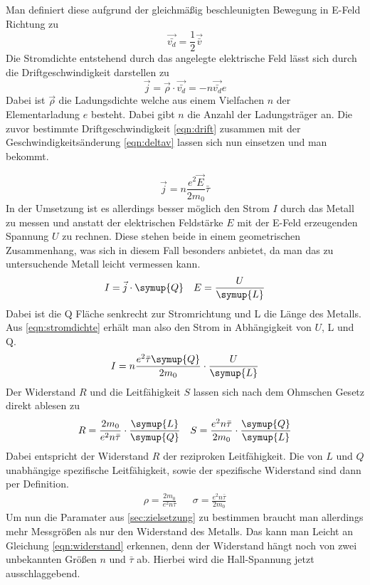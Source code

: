 Man definiert diese aufgrund der gleichmäßig beschleunigten Bewegung in E-Feld Richtung zu
\begin{equation}
\label{eqn:drift}
\vec{\bar{v_{d}}} = \frac{1}{2} \vec{\bar{v}}
\end{equation}
Die Stromdichte entstehend durch das angelegte elektrische Feld lässt sich durch die Driftgeschwindigkeit darstellen zu
\begin{equation}
\label{eqn:stromdichteunddrift}
\vec{j} = \vec{\rho} \cdot \vec{\bar{v_{d}}} = - n \vec{\bar{v_{d}}} e
\end{equation}
Dabei ist $\vec{\rho}$ die Ladungsdichte welche aus einem Vielfachen $n$ der Elementarladung $e$ besteht. Dabei gibt $n$ die Anzahl der Ladungsträger an.
Die zuvor bestimmte Driftgeschwindigkeit \eqref{eqn:drift} zusammen mit der Geschwindigkeitsänderung \eqref{eqn:deltav} lassen sich nun einsetzen und man bekommt.

\begin{equation}
\label{eqn:stromdichte}
\vec{j} = n \frac{e^{2}\vec{E}}{2m_{0}} \bar{\tau}
\end{equation}
In der Umsetzung ist es allerdings besser möglich den Strom $I$ durch das Metall zu messen und anstatt der elektrischen Feldstärke $E$ mit der E-Feld erzeugenden Spannung $U$
zu rechnen. Diese stehen beide in einem geometrischen Zusammenhang, was sich in diesem Fall besonders anbietet, da man das zu untersuchende Metall leicht vermessen kann.
\begin{align}
\label{eqn:querschnitt}
I = \vec{j} \cdot \symup{Q} && E = \frac{U}{\symup{L}}
\end{align}
Dabei ist die Q Fläche senkrecht zur Stromrichtung und L die Länge des Metalls.
Aus \eqref{eqn:stromdichte} erhält man also den Strom in Abhängigkeit von $U$, L und Q.
\begin{equation}
\label{eqn:strom}
I = n \frac{e^{2}\bar{\tau} \symup{Q}}{2m_{0}} \cdot \frac{U}{\symup{L}}
\end{equation}
Der Widerstand $R$ und die Leitfähigkeit $S$ lassen sich nach dem Ohmschen Gesetz direkt ablesen zu
\begin{align}
\label{eqn:widerstand}
R = \frac{2m_{0}}{e^{2}n \bar{\tau}} \cdot \frac{\symup{L}}{\symup{Q}} && S = \frac{e^{2}n \bar{\tau}}{2m_{0}} \cdot \frac{\symup{Q}}{\symup{L}}
\end{align}
Dabei entspricht der Widerstand $R$ der reziproken Leitfähigkeit. Die von $L$ und $Q$ unabhängige spezifische Leitfähigkeit, sowie der spezifische Widerstand sind dann per Definition.
\begin{align}
\nonumber
\rho = \frac{2m_{0}}{e^{2}n \bar{\tau}} && \sigma = \frac{e^{2}n \bar{\tau}}{2m_{0}} 
\end{align}
Um nun die Paramater aus \ref{sec:zielsetzung} zu bestimmen braucht man allerdings mehr Messgrößen als nur den Widerstand des Metalls. Das kann man Leicht an Gleichung
\eqref{eqn:widerstand} erkennen, denn der Widerstand hängt noch von zwei unbekannten Größen $n$ und $\bar{\tau}$ ab.
Hierbei wird die Hall-Spannung jetzt ausschlaggebend.

